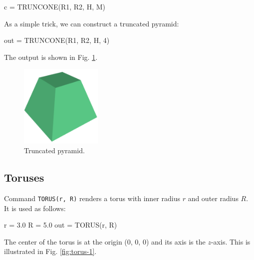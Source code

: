\begin{bluecode}
c = TRUNCONE(R1, R2, H, M)
\end{bluecode}
As a simple trick, we can construct a truncated pyramid:

\begin{bluecode}
out = TRUNCONE(R1, R2, H, 4)
\end{bluecode}
The output is shown in Fig. \ref{fig:tcone-9}.

\begin{figure}[!ht]
\begin{center}
\includegraphics[width=0.35\textwidth]{img/tcone-9.png}
\end{center}
\vspace{-6mm}
\caption{Truncated pyramid.}
\label{fig:tcone-9}
\end{figure}


\subsection{Toruses}

Command {\tt TORUS(r, R)} renders a torus with inner radius $r$ and outer 
radius $R$. It is used as follows:
\begin{bluecode}
r = 3.0
R = 5.0
out = TORUS(r, R)
\end{bluecode}
The center of the torus is at the origin (0, 0, 0) and its axis
is the $z$-axis. This is illustrated in Fig. \ref{fig:torus-1}.

